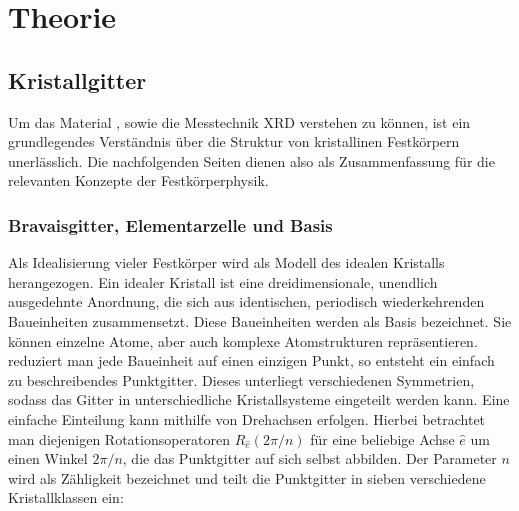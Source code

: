 \section{Theorie}

\subsection{Kristallgitter}
Um das Material , sowie die Messtechnik XRD verstehen zu können, ist ein grundlegendes Verständnis
über die Struktur von kristallinen Festkörpern unerlässlich.
Die nachfolgenden Seiten dienen also als Zusammenfassung für die relevanten Konzepte der Festkörperphysik.

\subsubsection{Bravaisgitter, Elementarzelle und Basis}
Als Idealisierung vieler Festkörper wird als Modell des idealen Kristalls herangezogen.
Ein idealer Kristall ist eine dreidimensionale, unendlich ausgedehnte Anordnung, die sich aus identischen, periodisch
wiederkehrenden Baueinheiten zusammensetzt.
Diese Baueinheiten werden als Basis bezeichnet.
Sie können einzelne Atome, aber auch komplexe Atomstrukturen repräsentieren.
reduziert man jede Baueinheit auf einen einzigen Punkt, so entsteht ein einfach zu beschreibendes Punktgitter.
\autocite[49]{Hunklinger}
Dieses unterliegt verschiedenen Symmetrien, sodass das Gitter in unterschiedliche Kristallsysteme eingeteilt werden
kann.
Eine einfache Einteilung kann mithilfe von Drehachsen erfolgen.
Hierbei betrachtet man diejenigen Rotationsoperatoren $R_{\hat{e}}(2\pi / n)$ für eine beliebige Achse $\hat{e}$ um
einen Winkel $2 \pi /n$, die das Punktgitter auf sich selbst abbilden.
Der Parameter $n$ wird als Zähligkeit bezeichnet und teilt die Punktgitter in sieben verschiedene Kristallklassen ein:
\autocite[53]{Hunklinger}


